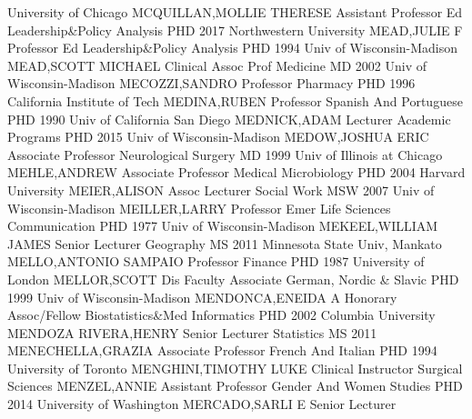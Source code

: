 \documentclass[
]{article}
\begin{document}
University of Chicago \textbar MCQUILLAN,MOLLIE THERESE \textbar{}
 \textbar Assistant Professor \textbar Ed Leadership\&Policy
Analysis \textbar PHD 2017 Northwestern University \textbar MEAD,JULIE F
\textbar{}  \textbar Professor \textbar Ed
Leadership\&Policy Analysis \textbar PHD 1994 Univ of Wisconsin-Madison
\textbar MEAD,SCOTT MICHAEL \textbar{}  \textbar Clinical
Assoc Prof \textbar Medicine \textbar MD 2002 Univ of Wisconsin-Madison
\textbar MECOZZI,SANDRO \textbar{}  \textbar Professor
\textbar Pharmacy \textbar PHD 1996 California Institute of Tech
\textbar MEDINA,RUBEN \textbar{}  \textbar Professor
\textbar Spanish And Portuguese \textbar PHD 1990 Univ of California San
Diego \textbar MEDNICK,ADAM \textbar{}  \textbar Lecturer
\textbar Academic Programs \textbar PHD 2015 Univ of Wisconsin-Madison
\textbar MEDOW,JOSHUA ERIC \textbar{}  \textbar Associate
Professor \textbar Neurological Surgery \textbar MD 1999 Univ of
Illinois at Chicago \textbar MEHLE,ANDREW \textbar{} 
\textbar Associate Professor \textbar Medical Microbiology \textbar PHD
2004 Harvard University \textbar MEIER,ALISON \textbar{} 
\textbar Assoc Lecturer \textbar Social Work \textbar MSW 2007 Univ of
Wisconsin-Madison \textbar MEILLER,LARRY \textbar{} 
\textbar Professor Emer \textbar Life Sciences Communication
\textbar PHD 1977 Univ of Wisconsin-Madison \textbar MEKEEL,WILLIAM
JAMES \textbar{}  \textbar Senior Lecturer
\textbar Geography \textbar MS 2011 Minnesota State Univ, Mankato
\textbar MELLO,ANTONIO SAMPAIO \textbar{} 
\textbar Professor \textbar Finance \textbar PHD 1987 University of
London \textbar MELLOR,SCOTT \textbar{}  \textbar Dis
Faculty Associate \textbar German, Nordic \& Slavic \textbar PHD 1999
Univ of Wisconsin-Madison \textbar MENDONCA,ENEIDA A \textbar{}
 \textbar Honorary Assoc/Fellow \textbar Biostatistics\&Med
Informatics \textbar PHD 2002 Columbia University \textbar MENDOZA
RIVERA,HENRY \textbar{}  \textbar Senior Lecturer
\textbar Statistics \textbar MS 2011 \textbar MENECHELLA,GRAZIA
\textbar{}  \textbar Associate Professor \textbar French And
Italian \textbar PHD 1994 University of Toronto
\textbar MENGHINI,TIMOTHY LUKE \textbar{}  \textbar Clinical
Instructor \textbar Surgical Sciences \textbar MENZEL,ANNIE
\textbar Assistant Professor \textbar{}  \textbar Gender And
Women Studies \textbar PHD 2014 University of Washington
\textbar MERCADO,SARLI E \textbar Senior Lecturer \textbar{}
\end{document}

